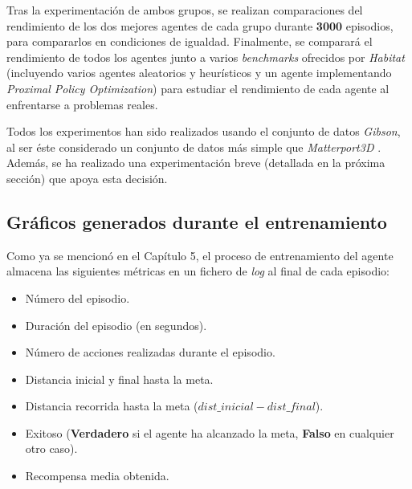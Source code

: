 Tras la experimentación de ambos grupos, se realizan comparaciones del rendimiento de los dos mejores agentes de cada grupo durante \textbf{3000} episodios, para compararlos en condiciones de igualdad. Finalmente, se comparará el rendimiento de todos los agentes junto a varios \textit{benchmarks} ofrecidos por \textit{Habitat} (incluyendo varios agentes aleatorios y heurísticos y un agente implementando \textit{Proximal Policy Optimization}) para estudiar el rendimiento de cada agente al enfrentarse a problemas reales.

Todos los experimentos han sido realizados usando el conjunto de datos \textit{Gibson}, al ser éste considerado un conjunto de datos más simple que \textit{Matterport3D} \cite{habitat19iccv}. Además, se ha realizado una experimentación breve (detallada en la próxima sección) que apoya esta decisión.

\subsection{Gráficos generados durante el entrenamiento}

Como ya se mencionó en el Capítulo 5, el proceso de entrenamiento del agente almacena las siguientes métricas en un fichero de \textit{log} al final de cada episodio:
\begin{itemize}
	\item Número del episodio.
	\item Duración del episodio (en segundos).
	\item Número de acciones realizadas durante el episodio.
	\item Distancia inicial y final hasta la meta.
	\item Distancia recorrida hasta la meta ($dist\_inicial - dist\_final$).
	\item Exitoso (\textbf{Verdadero} si el agente ha alcanzado la meta, \textbf{Falso} en cualquier otro caso).
	\item Recompensa media obtenida.
\end{itemize}

